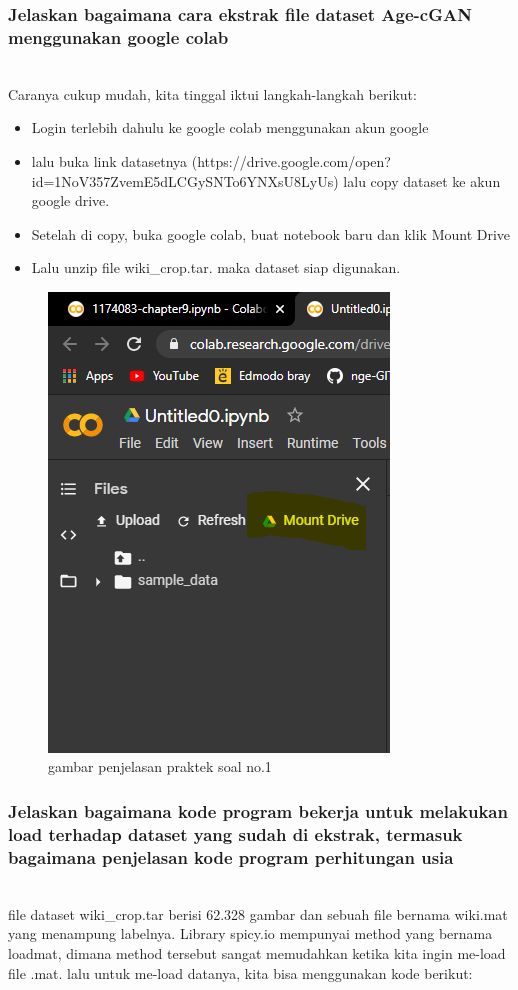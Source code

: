 \subsubsection{Jelaskan bagaimana cara ekstrak file dataset Age-cGAN menggunakan google colab}
\hfill\\
Caranya cukup mudah, kita tinggal iktui langkah-langkah berikut:
\begin{itemize}
\item Login terlebih dahulu ke google colab menggunakan akun google
\item lalu buka link datasetnya (https://drive.google.com/open?id=1NoV357ZvemE5dLCGySNTo6YNXsU8LyUs) lalu copy dataset ke akun google drive.
\item Setelah di copy, buka google colab, buat notebook baru dan klik Mount Drive
\item Lalu unzip file wiki\_crop.tar. maka dataset siap digunakan. 
\end{itemize}
\begin{figure}[H]
	\centering
	\includegraphics[scale=0.5]{figures/1174083/figures9/p1.png}
	\caption{gambar penjelasan praktek soal no.1}
\end{figure}

\subsubsection{Jelaskan bagaimana kode program bekerja untuk melakukan load terhadap dataset yang sudah di ekstrak, termasuk bagaimana penjelasan kode program perhitungan usia}
\hfill\\
file dataset wiki\_crop.tar berisi 62.328 gambar dan sebuah file bernama wiki.mat yang menampung labelnya. Library spicy.io mempunyai method yang bernama loadmat, dimana method tersebut sangat memudahkan ketika kita ingin me-load file .mat. lalu untuk me-load datanya, kita bisa menggunakan kode berikut:


